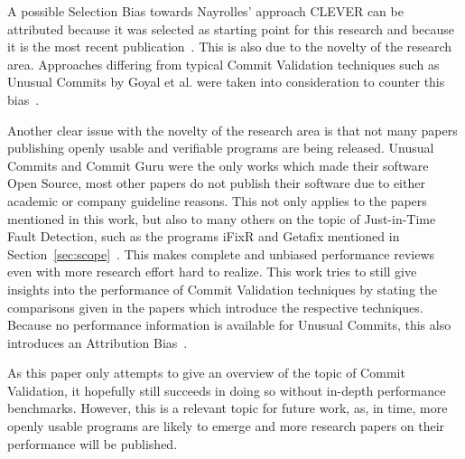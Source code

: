 A possible Selection Bias towards Nayrolles' approach CLEVER can be attributed because it was selected as starting point for this research and because it is the most recent publication~\cite{Nayrolles2018}. This is also due to the novelty of the research area. Approaches differing from typical Commit Validation techniques such as Unusual Commits by Goyal et al. were taken into consideration to counter this bias~\cite{Goyal2017}.

Another clear issue with the novelty of the research area is that not many papers publishing openly usable and verifiable programs are being released. Unusual Commits and Commit Guru were the only works which made their software Open Source, most other papers do not publish their software due to either academic or company guideline reasons. This not only applies to the papers mentioned in this work, but also to many others on the topic of Just-in-Time Fault Detection, such as the programs iFixR and Getafix mentioned in Section~\ref{sec:scope}~\cite{Koyuncu2019,Bader2019}. This makes complete and unbiased performance reviews even with more research effort hard to realize. This work tries to still give insights into the performance of Commit Validation techniques by stating the comparisons given in the papers which introduce the respective techniques. Because no performance information is available for Unusual Commits, this also introduces an Attribution Bias~\cite{Goyal2017}.

As this paper only attempts to give an overview of the topic of Commit Validation, it hopefully still succeeds in doing so without in-depth performance benchmarks. However, this is a relevant topic for future work, as, in time, more openly usable programs are likely to emerge and more research papers on their performance will be published.





